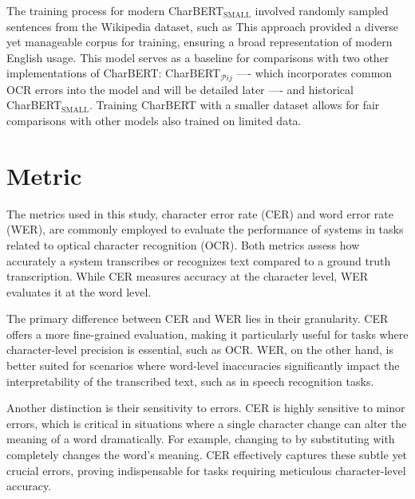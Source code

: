 The training process for modern CharBERT$_{\text{SMALL}}$ involved randomly sampled sentences from the Wikipedia dataset, such as  This approach provided a diverse yet manageable corpus for training, ensuring a broad representation of modern English usage. This model serves as a baseline for comparisons with two other implementations of CharBERT: CharBERT$_{\mathcal{P}{ij}}$ —- which incorporates common OCR errors into the model and will be detailed later —- and historical CharBERT$_{\text{SMALL}}$. Training CharBERT with a smaller dataset allows for fair comparisons with other models also trained on limited data.
\section{Metric}
\label{sec:5_metric}
The metrics used in this study, character error rate (CER) and word error rate (WER), are commonly employed to evaluate the performance of systems in tasks related to optical character recognition (OCR). Both metrics assess how accurately a system transcribes or recognizes text compared to a ground truth transcription. While CER measures accuracy at the character level, WER evaluates it at the word level.

The primary difference between CER and WER lies in their granularity. CER offers a more fine-grained evaluation, making it particularly useful for tasks where character-level precision is essential, such as OCR. WER, on the other hand, is better suited for scenarios where word-level inaccuracies significantly impact the interpretability of the transcribed text, such as in speech recognition tasks.

Another distinction is their sensitivity to errors. CER is highly sensitive to minor errors, which is critical in situations where a single character change can alter the meaning of a word dramatically. For example, changing  to  by substituting  with  completely changes the word's meaning. CER effectively captures these subtle yet crucial errors, proving indispensable for tasks requiring meticulous character-level accuracy.

